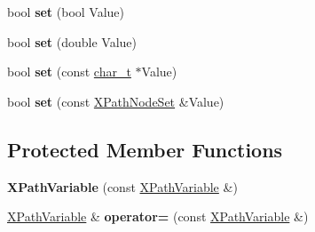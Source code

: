 \begin{DoxyCompactItemize}
\item 
\hypertarget{classphys_1_1xml_1_1XPathVariable_abec0df58ae37f5b223e2bcb5a5016faf}{
bool {\bfseries set} (bool Value)}
\label{df/dee/classphys_1_1xml_1_1XPathVariable_abec0df58ae37f5b223e2bcb5a5016faf}

\item 
\hypertarget{classphys_1_1xml_1_1XPathVariable_a6a7fb8a3f2028dc239ca1ed56b138df3}{
bool {\bfseries set} (double Value)}
\label{df/dee/classphys_1_1xml_1_1XPathVariable_a6a7fb8a3f2028dc239ca1ed56b138df3}

\item 
\hypertarget{classphys_1_1xml_1_1XPathVariable_a4d85aaa75317bb933823454be708fcbc}{
bool {\bfseries set} (const \hyperlink{namespacephys_1_1xml_afc87705cd1c2917d87b879715a2d8f6e}{char\_\-t} $\ast$Value)}
\label{df/dee/classphys_1_1xml_1_1XPathVariable_a4d85aaa75317bb933823454be708fcbc}

\item 
\hypertarget{classphys_1_1xml_1_1XPathVariable_a82db794d8380701c587d024501298a51}{
bool {\bfseries set} (const \hyperlink{classphys_1_1xml_1_1XPathNodeSet}{XPathNodeSet} \&Value)}
\label{df/dee/classphys_1_1xml_1_1XPathVariable_a82db794d8380701c587d024501298a51}

\end{DoxyCompactItemize}
\subsection*{Protected Member Functions}
\begin{DoxyCompactItemize}
\item 
\hypertarget{classphys_1_1xml_1_1XPathVariable_a37a47c3f05c4509f83193c1fa1c355e5}{
{\bfseries XPathVariable} (const \hyperlink{classphys_1_1xml_1_1XPathVariable}{XPathVariable} \&)}
\label{df/dee/classphys_1_1xml_1_1XPathVariable_a37a47c3f05c4509f83193c1fa1c355e5}

\item 
\hypertarget{classphys_1_1xml_1_1XPathVariable_a2cd8ec528ae06c55219ac32d0af78eee}{
\hyperlink{classphys_1_1xml_1_1XPathVariable}{XPathVariable} \& {\bfseries operator=} (const \hyperlink{classphys_1_1xml_1_1XPathVariable}{XPathVariable} \&)}
\label{df/dee/classphys_1_1xml_1_1XPathVariable_a2cd8ec528ae06c55219ac32d0af78eee}

\end{DoxyCompactItemize}
